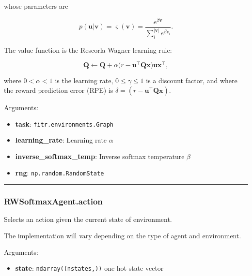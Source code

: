 whose parameters are

\[
p(\mathbf u|\mathbf v) = \varsigma(\mathbf v) = \frac{e^{\beta \mathbf v}}{\sum_{i}^{|\mathbf v|} e^{\beta v_i}}.
\]

The value function is the Rescorla-Wagner learning rule:

\[
\mathbf Q \gets \mathbf Q + \alpha \big(r - \mathbf u^\top \mathbf Q \mathbf x \big) \mathbf u \mathbf x^\top,
\]

where \(0 < \alpha < 1\) is the learning rate, \(0 \leq \gamma \leq 1\)
is a discount factor, and where the reward prediction error (RPE) is
\(\delta = (r - \mathbf u^\top \mathbf Q \mathbf x)\).

Arguments:

\begin{itemize}
\tightlist
\item
  \textbf{task}: \texttt{fitr.environments.Graph}
\item
  \textbf{learning\_rate}: Learning rate \(\alpha\)
\item
  \textbf{inverse\_softmax\_temp}: Inverse softmax temperature \(\beta\)
\item
  \textbf{rng}: \texttt{np.random.RandomState}
\end{itemize}

\begin{center}\rule{0.5\linewidth}{\linethickness}\end{center}

\hypertarget{rwsoftmaxagent.action}{%
\subsubsection{RWSoftmaxAgent.action}\label{rwsoftmaxagent.action}}

\begin{Shaded}
\begin{Highlighting}[]
\end{Highlighting}
\end{Shaded}

Selects an action given the current state of environment.

The implementation will vary depending on the type of agent and
environment.

Arguments:

\begin{itemize}
\tightlist
\item
  \textbf{state}: \texttt{ndarray((nstates,))} one-hot state vector
\end{itemize}

